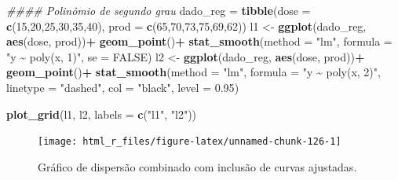\documentclass[
]{book}
\newenvironment{Shaded}{\begin{snugshade}}{\end{snugshade}}
\newcommand{\CommentTok}[1]{\textcolor[rgb]{0.56,0.35,0.01}{\textit{#1}}}
\newcommand{\DataTypeTok}[1]{\textcolor[rgb]{0.13,0.29,0.53}{#1}}
\newcommand{\DecValTok}[1]{\textcolor[rgb]{0.00,0.00,0.81}{#1}}
\newcommand{\FloatTok}[1]{\textcolor[rgb]{0.00,0.00,0.81}{#1}}
\newcommand{\KeywordTok}[1]{\textcolor[rgb]{0.13,0.29,0.53}{\textbf{#1}}}
\newcommand{\NormalTok}[1]{#1}
\newcommand{\OperatorTok}[1]{\textcolor[rgb]{0.81,0.36,0.00}{\textbf{#1}}}
\newcommand{\OtherTok}[1]{\textcolor[rgb]{0.56,0.35,0.01}{#1}}
\newcommand{\StringTok}[1]{\textcolor[rgb]{0.31,0.60,0.02}{#1}}
\numberwithin{equation}{section}
\begin{document}
\begin{Shaded}
\begin{Highlighting}[]
\CommentTok{\#\#\#\# Polinômio de segundo grau}
\NormalTok{dado\_reg =}\StringTok{ }\KeywordTok{tibble}\NormalTok{(}\DataTypeTok{dose =} \KeywordTok{c}\NormalTok{(}\DecValTok{15}\NormalTok{,}\DecValTok{20}\NormalTok{,}\DecValTok{25}\NormalTok{,}\DecValTok{30}\NormalTok{,}\DecValTok{35}\NormalTok{,}\DecValTok{40}\NormalTok{),}
                  \DataTypeTok{prod =} \KeywordTok{c}\NormalTok{(}\DecValTok{65}\NormalTok{,}\DecValTok{70}\NormalTok{,}\DecValTok{73}\NormalTok{,}\DecValTok{75}\NormalTok{,}\DecValTok{69}\NormalTok{,}\DecValTok{62}\NormalTok{))}
\NormalTok{l1 \textless{}{-}}\StringTok{ }\KeywordTok{ggplot}\NormalTok{(dado\_reg, }\KeywordTok{aes}\NormalTok{(dose, prod))}\OperatorTok{+}
\StringTok{      }\KeywordTok{geom\_point}\NormalTok{()}\OperatorTok{+}
\StringTok{      }\KeywordTok{stat\_smooth}\NormalTok{(}\DataTypeTok{method =} \StringTok{"lm"}\NormalTok{,}
                  \DataTypeTok{formula =} \StringTok{"y \textasciitilde{} poly(x, 1)"}\NormalTok{,}
                  \DataTypeTok{se =} \OtherTok{FALSE}\NormalTok{)}
\NormalTok{l2 \textless{}{-}}\StringTok{ }\KeywordTok{ggplot}\NormalTok{(dado\_reg, }\KeywordTok{aes}\NormalTok{(dose, prod))}\OperatorTok{+}
\StringTok{      }\KeywordTok{geom\_point}\NormalTok{()}\OperatorTok{+}
\StringTok{      }\KeywordTok{stat\_smooth}\NormalTok{(}\DataTypeTok{method =} \StringTok{"lm"}\NormalTok{,}
                  \DataTypeTok{formula =} \StringTok{"y \textasciitilde{} poly(x, 2)"}\NormalTok{,}
                  \DataTypeTok{linetype =} \StringTok{"dashed"}\NormalTok{,}
                  \DataTypeTok{col =} \StringTok{"black"}\NormalTok{,}
                  \DataTypeTok{level =} \FloatTok{0.95}\NormalTok{)}

\KeywordTok{plot\_grid}\NormalTok{(l1, l2, }\DataTypeTok{labels =} \KeywordTok{c}\NormalTok{(}\StringTok{"l1"}\NormalTok{, }\StringTok{"l2"}\NormalTok{))}
\end{Highlighting}
\end{Shaded}

\begin{figure}

{\centering \texttt{[image: html\_r\_files/figure-latex/unnamed-chunk-126-1]} 

}

\caption{Gráfico de dispersão combinado com inclusão de curvas ajustadas.}\label{fig:unnamed-chunk-126}
\end{figure}
\end{document}
